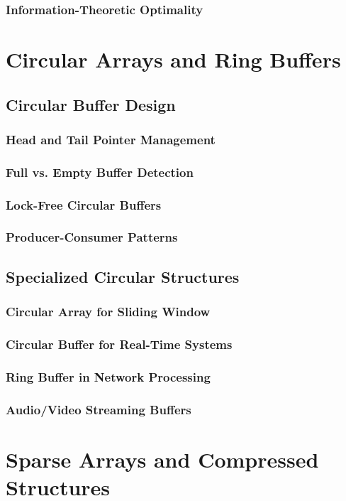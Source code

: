 \documentclass[12pt, oneside]{book}
\begin{document}
\subsubsection{Information-Theoretic Optimality}

\section{Circular Arrays and Ring Buffers}
\subsection{Circular Buffer Design}
\subsubsection{Head and Tail Pointer Management}
\subsubsection{Full vs. Empty Buffer Detection}
\subsubsection{Lock-Free Circular Buffers}
\subsubsection{Producer-Consumer Patterns}

\subsection{Specialized Circular Structures}
\subsubsection{Circular Array for Sliding Window}
\subsubsection{Circular Buffer for Real-Time Systems}
\subsubsection{Ring Buffer in Network Processing}
\subsubsection{Audio/Video Streaming Buffers}

\section{Sparse Arrays and Compressed Structures}
\end{document}
